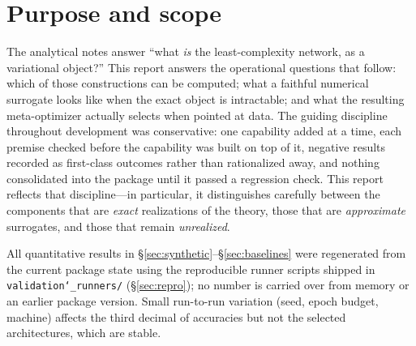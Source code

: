 \documentclass[11pt]{article}
\newcommand{\allowbreakhere}{\discretionary{}{}{}}
\newcommand{\code}[1]{\texttt{\def\_{\char`_\allowbreakhere}#1}}
\begin{document}
\begin{abstract}
testing respectively), quotients them out to reduce dimensionality, and only then hands a minimal
representation to the metaoptimizer; we connect this reduction to the information bottleneck~\cite{tishby2015ib,tishby1999ib}, validate
it on QM7 molecular data (where it cuts rotated-test error substantially), and are candid about its
false-positive failure mode on smooth ordered data and the guards required to contain it.
We are explicit throughout about the boundary between
what the theory promises and what the implementation delivers: several of the sharpest
analytical structures are realized only in approximate or heuristic form, and a number of the
theory's negative predictions were confirmed empirically. A closing section collects open
questions and future
directions distilled from the development history.
\end{abstract}

\tableofcontents

\section{Purpose and scope}
\label{sec:purpose}

The analytical notes answer ``what \emph{is} the least-complexity network, as a variational
object?'' This report answers the operational questions that follow: which of those
constructions can be computed; what a faithful numerical surrogate looks like when the exact
object is intractable; and what the resulting meta-optimizer actually selects when pointed at
data. The guiding discipline throughout development was conservative: one capability added at
a time, each premise checked before the capability was built on top of it, negative results
recorded as first-class outcomes rather than rationalized away, and nothing consolidated into
the package until it passed a regression check. This report reflects that discipline---in
particular, it distinguishes carefully between the components that are \emph{exact}
realizations of the theory, those that are \emph{approximate} surrogates, and those that
remain \emph{unrealized}.

All quantitative results in \S\ref{sec:synthetic}--\S\ref{sec:baselines} were regenerated
from the current package state using the reproducible runner scripts shipped in
\code{validation\_runners/} (\S\ref{sec:repro}); no number is carried over from memory or an
earlier package version. Small run-to-run variation (seed, epoch budget, machine) affects the
third decimal of accuracies but not the selected architectures, which are stable.
\end{document}
